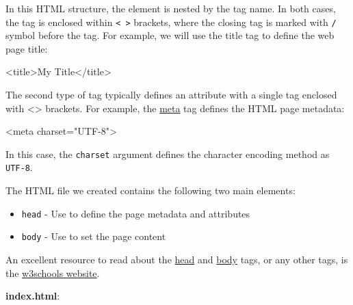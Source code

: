 \documentclass[
  letterpaper,
  DIV=11,
  numbers=noendperiod]{scrreprt}
\newenvironment{Shaded}{\begin{snugshade}}{\end{snugshade}}
\newcommand{\ErrorTok}[1]{\textcolor[rgb]{0.68,0.00,0.00}{#1}}
\newcommand{\KeywordTok}[1]{\textcolor[rgb]{0.00,0.23,0.31}{#1}}
\newcommand{\NormalTok}[1]{\textcolor[rgb]{0.00,0.23,0.31}{#1}}
\newcommand{\OtherTok}[1]{\textcolor[rgb]{0.00,0.23,0.31}{#1}}
\newcommand{\StringTok}[1]{\textcolor[rgb]{0.13,0.47,0.30}{#1}}
\providecommand{\tightlist}{%
  \setlength{\itemsep}{0pt}\setlength{\parskip}{0pt}}\usepackage{longtable,booktabs,array}
\begin{document}
In this HTML structure, the element is nested by the tag name. In both
cases, the tag is enclosed within \texttt{\textless{}\ \textgreater{}}
brackets, where the closing tag is marked with \texttt{/} symbol before
the tag. For example, we will use the title tag to define the web page
title:

\begin{Shaded}
\begin{Highlighting}[]
\KeywordTok{\textless{}title\textgreater{}}\NormalTok{My Title}\KeywordTok{\textless{}/title\textgreater{}}
\end{Highlighting}
\end{Shaded}

The second type of tag typically defines an attribute with a single tag
enclosed with \textless\textgreater{} brackets. For example, the
\href{https://www.w3schools.com/tags/tag_meta.asp}{meta} tag defines the
HTML page metadata:

\begin{Shaded}
\begin{Highlighting}[]
\KeywordTok{\textless{}meta} \ErrorTok{charset}\OtherTok{=}\StringTok{"UTF{-}8"}\KeywordTok{\textgreater{}}
\end{Highlighting}
\end{Shaded}

In this case, the \texttt{charset} argument defines the character
encoding method as \texttt{UTF-8}.

The HTML file we created contains the following two main elements:

\begin{itemize}
\tightlist
\item
  \texttt{head} - Use to define the page metadata and attributes
\item
  \texttt{body} - Use to set the page content
\end{itemize}

An excellent resource to read about the
\href{https://www.w3schools.com/tags/tag_head.asp}{head} and
\href{https://www.w3schools.com/tags/tag_body.asp}{body} tags, or any
other tags, is the
\href{https://www.w3schools.com/html/default.asp}{w3schools website}.

\textbf{index.html}:
\end{document}
